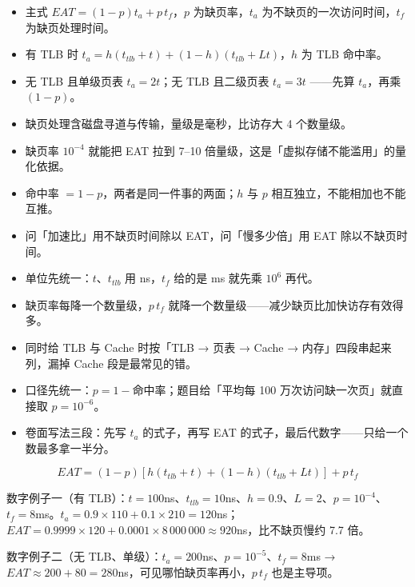 \documentclass[10pt,a4paper]{ctexart}
\begin{document}
\begin{itemize}

\item 主式 $EAT=(1-p)t_a+p\,t_f$，$p$ 为缺页率，$t_a$ 为不缺页的一次访问时间，$t_f$ 为缺页处理时间。

\item 有 TLB 时 $t_a=h(t_{tlb}+t)+(1-h)(t_{tlb}+Lt)$，$h$ 为 TLB 命中率。

\item 无 TLB 且单级页表 $t_a=2t$；无 TLB 且二级页表 $t_a=3t$ ——先算 $t_a$，再乘 $(1-p)$。

\item 缺页处理含磁盘寻道与传输，量级是毫秒，比访存大 4 个数量级。

\item 缺页率 $10^{-4}$ 就能把 EAT 拉到 7–10 倍量级，这是「虚拟存储不能滥用」的量化依据。

\item 命中率 $=1-p$，两者是同一件事的两面；$h$ 与 $p$ 相互独立，不能相加也不能互推。

\item 问「加速比」用不缺页时间除以 EAT，问「慢多少倍」用 EAT 除以不缺页时间。

\item 单位先统一：$t$、$t_{tlb}$ 用 ns，$t_f$ 给的是 ms 就先乘 $10^6$ 再代。

\item 缺页率每降一个数量级，$p\,t_f$ 就降一个数量级——减少缺页比加快访存有效得多。

\item 同时给 TLB 与 Cache 时按「TLB → 页表 → Cache → 内存」四段串起来列，漏掉 Cache 段是最常见的错。

\item 口径先统一：$p=1-$命中率；题目给「平均每 100 万次访问缺一次页」就直接取 $p=10^{-6}$。

\item 卷面写法三段：先写 $t_a$ 的式子，再写 EAT 的式子，最后代数字——只给一个数最多拿一半分。

\end{itemize}

\[
EAT=(1-p)\left[h(t_{tlb}+t)+(1-h)(t_{tlb}+Lt)\right]+p\,t_f
\]

数字例子一（有 TLB）：$t=100$ns、$t_{tlb}=10$ns、$h=0.9$、$L=2$、$p=10^{-4}$、$t_f=8$ms。$t_a=0.9\times 110+0.1\times 210=120$ns；$EAT=0.9999\times 120+0.0001\times 8\,000\,000\approx 920$ns，比不缺页慢约 7.7 倍。

数字例子二（无 TLB、单级）：$t_a=200$ns、$p=10^{-5}$、$t_f=8$ms → $EAT\approx 200+80=280$ns，可见哪怕缺页率再小，$p\,t_f$ 也是主导项。
\end{document}

